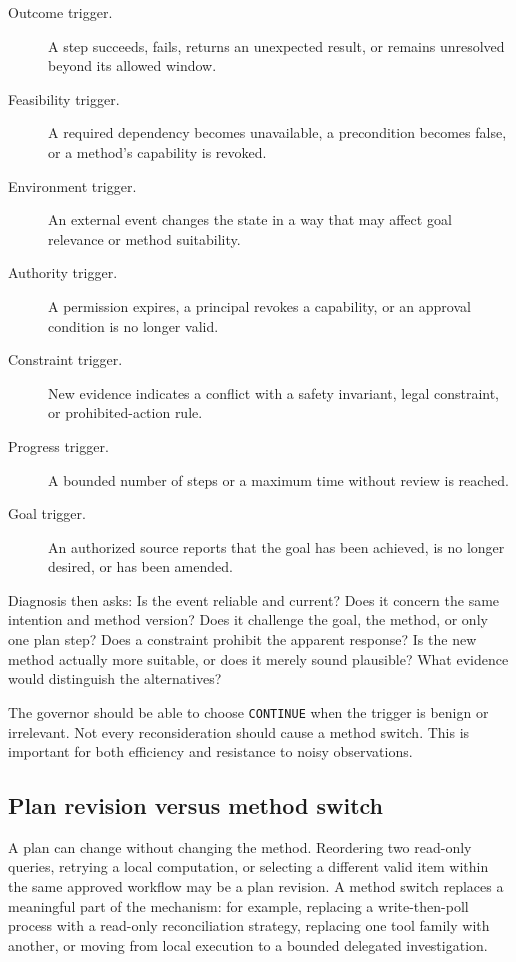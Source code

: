 \begin{description}
  \item[Outcome trigger.] A step succeeds, fails, returns an unexpected result, or remains unresolved beyond its allowed window.
  \item[Feasibility trigger.] A required dependency becomes unavailable, a precondition becomes false, or a method's capability is revoked.
  \item[Environment trigger.] An external event changes the state in a way that may affect goal relevance or method suitability.
  \item[Authority trigger.] A permission expires, a principal revokes a capability, or an approval condition is no longer valid.
  \item[Constraint trigger.] New evidence indicates a conflict with a safety invariant, legal constraint, or prohibited-action rule.
  \item[Progress trigger.] A bounded number of steps or a maximum time without review is reached.
  \item[Goal trigger.] An authorized source reports that the goal has been achieved, is no longer desired, or has been amended.
\end{description}

Diagnosis then asks: Is the event reliable and current? Does it concern the same intention and method version? Does it challenge the goal, the method, or only one plan step? Does a constraint prohibit the apparent response? Is the new method actually more suitable, or does it merely sound plausible? What evidence would distinguish the alternatives?

The governor should be able to choose \texttt{CONTINUE} when the trigger is benign or irrelevant. Not every reconsideration should cause a method switch. This is important for both efficiency and resistance to noisy observations.

\subsection{Plan revision versus method switch}

A plan can change without changing the method. Reordering two read-only queries, retrying a local computation, or selecting a different valid item within the same approved workflow may be a plan revision. A method switch replaces a meaningful part of the mechanism: for example, replacing a write-then-poll process with a read-only reconciliation strategy, replacing one tool family with another, or moving from local execution to a bounded delegated investigation.

